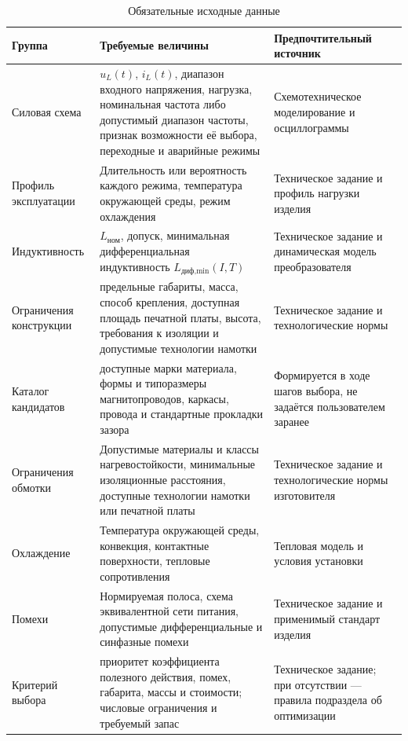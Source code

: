 \documentclass[14pt,a4paper]{extarticle}
\begin{document}
\begin{table}[H]
\begin{singlespace}
\caption{Обязательные исходные данные}
\label{tab:required-inputs}
\centering
\scriptsize
\begin{tabularx}{\textwidth}{>{\raggedright\arraybackslash}p{38mm}
>{\raggedright\arraybackslash}X
>{\raggedright\arraybackslash}p{48mm}}
\toprule
Группа & Требуемые величины & Предпочтительный источник \\
\midrule
Силовая схема &
$u_L(t)$, $i_L(t)$, диапазон входного напряжения, нагрузка, номинальная
частота либо допустимый диапазон частоты, признак возможности её выбора,
переходные и аварийные режимы &
Схемотехническое моделирование и осциллограммы \\
Профиль эксплуатации &
Длительность или вероятность каждого режима, температура окружающей среды,
режим охлаждения &
Техническое задание и профиль нагрузки изделия \\
Индуктивность &
$L_{\text{ном}}$, допуск, минимальная дифференциальная индуктивность
$L_{\text{диф,min}}(I,T)$ &
Техническое задание и динамическая модель преобразователя \\
Ограничения конструкции &
предельные габариты, масса, способ крепления, доступная площадь печатной
платы, высота, требования к изоляции и допустимые технологии намотки &
Техническое задание и технологические нормы \\
Каталог кандидатов &
доступные марки материала, формы и типоразмеры магнитопроводов, каркасы,
провода и стандартные прокладки зазора &
Формируется в ходе шагов выбора, не задаётся пользователем заранее \\
Ограничения обмотки &
Допустимые материалы и классы нагревостойкости, минимальные изоляционные
расстояния, доступные технологии намотки или печатной платы &
Техническое задание и технологические нормы изготовителя \\
Охлаждение &
Температура окружающей среды, конвекция, контактные поверхности,
тепловые сопротивления &
Тепловая модель и условия установки \\
Помехи &
Нормируемая полоса, схема эквивалентной сети питания, допустимые
дифференциальные и синфазные помехи &
Техническое задание и применимый стандарт изделия \\
Критерий выбора &
приоритет коэффициента полезного действия, помех, габарита, массы и стоимости;
числовые ограничения и требуемый запас &
Техническое задание; при отсутствии --- правила подраздела об оптимизации \\
\bottomrule
\end{tabularx}
\end{singlespace}
\end{table}
\end{document}
